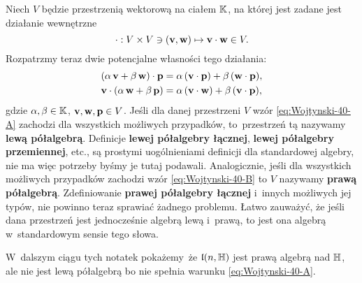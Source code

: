 \documentclass[a4paper,11pt]{article}
\begin{document}
Niech $V$ będzie przestrzenią wektorową na ciałem $\mathbb{K}$, na której jest
zadane jest działanie wewnętrzne
\begin{equation}
  \label{eq:Wojtynsi-39}
  \cdot : V \times V \ni ( \mathbf{v}, \mathbf{w} ) \mapsto \mathbf{v} \cdot \mathbf{w} \in V.
\end{equation}
Rozpatrzmy teraz dwie potencjalne własności tego działania:
\begin{subequations}
  \begin{align}
    \label{eq:Wojtynski-40-A}
    &( \alpha \, \mathbf{v} + \beta \, \mathbf{w} ) \cdot \mathbf{p} =
      \alpha \, ( \mathbf{v} \cdot \mathbf{p} ) + \beta \, ( \mathbf{w} \cdot \mathbf{p} ), \\
    \label{eq:Wojtynski-40-B}
    &\mathbf{v} \cdot ( \alpha \, \mathbf{w} + \beta \, \mathbf{p} ) =
      \alpha \, ( \mathbf{v} \cdot \mathbf{w} ) + \beta \, ( \mathbf{v} \cdot \mathbf{p} ),
  \end{align}
\end{subequations}
gdzie $\alpha, \beta \in \mathbb{K}$, $\mathbf{v}, \mathbf{w}, \mathbf{p} \in V$. Jeśli dla
danej przestrzeni $V$ wzór \eqref{eq:Wojtynski-40-A} zachodzi dla
wszystkich możliwych przypadków, to~przestrzeń tą nazywamy \textbf{lewą
  półalgebrą}. Definicje \textbf{lewej półalgebry łącznej}, \textbf{lewej
  półalgebry przemiennej}, etc., są prostymi uogólnieniami definicji dla
standardowej algebry, nie ma więc potrzeby byśmy je tutaj podawali.
Analogicznie, jeśli dla wszystkich
możliwych przypadków zachodzi wzór \eqref{eq:Wojtynski-40-B} to $V$ nazywamy
\textbf{prawą półalgebrą}. Zdefiniowanie \textbf{prawej półalgebry łącznej}
i~innych możliwych jej typów, nie powinno teraz sprawiać żadnego problemu.
Łatwo zauważyć, że jeśli dana przestrzeń jest jednocześnie algebrą lewą
i~prawą, to jest ona algebrą w~standardowym sensie tego słowa.

W~dalszym ciągu tych notatek pokażemy~że $\mathfrak{l}( n, \mathbb{H} )$ jest prawą
algebrą nad $\mathbb{H}$, ale nie jest lewą półalgebrą bo nie spełnia warunku
\eqref{eq:Wojtynski-40-A}.
\end{document}
